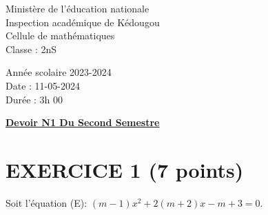 \documentclass{article}
\begin{document}
\begin{minipage}{0.5\textwidth}
	Ministère de l'éducation nationale  \\
	Inspection académique de Kédougou   \\
	Cellule de mathématiques            \\
	Classe : 2nS  \\
\end{minipage}
\begin{minipage}{0.5\textwidth}
	Année scolaire 2023-2024 \\
	Date : 11-05-2024 \\
	Durée : 3h 00 \\
\end{minipage}

\begin{center}
	\textbf{{\underline{Devoir N1 Du Second Semestre}}}
\end{center}
\section*{EXERCICE 1 (7 points)}   
Soit l’équation (E): \((m -1)x^2 + 2(m + 2)x - m + 3 = 0\).
\end{document}
